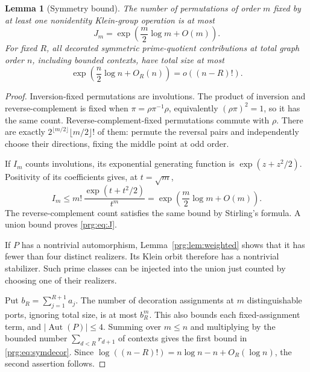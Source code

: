 \documentclass[11pt,letterpaper]{article}
\numberwithin{equation}{section}
\newtheorem{lemma}[theorem]{Lemma}
\theoremstyle{definition}\newtheorem{definition}[theorem]{Definition}
\theoremstyle{remark}\newtheorem{remark}[theorem]{Remark}
\DeclareMathOperator{\Aut}{Aut}
\begin{document}
\begin{lemma}[Symmetry bound]\label{prg:lem:symmetry}
The number of permutations of order $m$ fixed by at least one
nonidentity Klein-group operation is at most
\begin{equation}\label{prg:eq:J}
 J_m=\exp\left(\frac m2\log m+O(m)\right).
\end{equation}
For fixed $R$, all decorated symmetric prime-quotient contributions
at total graph order $n$, including bounded contexts, have total
size at most
\begin{equation}\label{prg:eq:symdecor}
 \exp\left(\frac n2\log n+O_R(n)\right)
       =o((n-R)!).
\end{equation}
\end{lemma}
\begin{proof}
Inversion-fixed permutations are involutions. The product of
inversion and reverse-complement is fixed when
$\pi=\rho\pi^{-1}\rho$, equivalently $(\rho\pi)^2=1$, so it has
the same count. Reverse-complement-fixed permutations commute with
$\rho$. There are exactly
$2^{\lfloor m/2\rfloor}\lfloor m/2\rfloor!$ of them: permute the
reversal pairs and independently choose their directions, fixing
the middle point at odd order.

If $I_m$ counts involutions, its exponential generating function is
$\exp(z+z^2/2)$. Positivity of its coefficients gives, at
$t=\sqrt m$,
\[
 I_m\leq m!\,\frac{\exp(t+t^2/2)}{t^m}
      =\exp\left(\frac m2\log m+O(m)\right).
\]
The reverse-complement count satisfies the same bound by Stirling's
formula. A union bound proves \eqref{prg:eq:J}.

If $P$ has a nontrivial automorphism, Lemma~\ref{prg:lem:weighted}
shows that it has fewer than four distinct realizers. Its Klein
orbit therefore has a nontrivial stabilizer. Such prime classes
can be injected into the union just counted by choosing one of
their realizers.

Put $b_R=\sum_{j=1}^{R+1}a_j$. The number of decoration assignments
at $m$ distinguishable ports, ignoring total size, is at most
$b_R^m$. This also bounds each fixed-assignment term, and
$|\Aut(P)|\leq4$. Summing over $m\leq n$ and multiplying by the
bounded number $\sum_{d<R}r_{d+1}$ of contexts gives the first
bound in \eqref{prg:eq:symdecor}. Since
$\log((n-R)!)=n\log n-n+O_R(\log n)$, the second assertion follows.
\end{proof}
\end{document}
